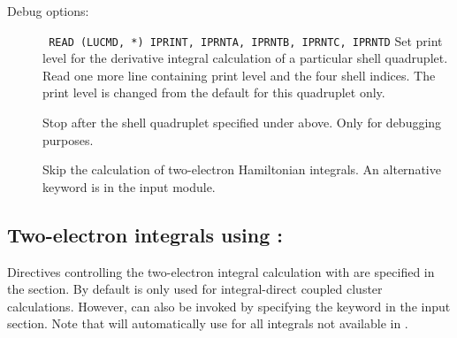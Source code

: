 Debug options:

\begin{description}

\item[]\verb| |\newline
\verb|READ (LUCMD, *) IPRINT, IPRNTA, IPRNTB, IPRNTC, IPRNTD|
Set print level for the derivative integral calculation of a particular shell
quadruplet.  Read one more line containing print level and the four
shell indices.  The print level is changed from the default
for this quadruplet only.

\item[] Stop after the shell quadruplet specified
under  above. Only for debugging purposes.

\item[] Skip the calculation of two-electron Hamiltonian
integrals. An alternative keyword is  in the 
input module.


\end{description}


\subsection{Two-electron integrals using {\eri}: }
\label{ch:eri}

Directives controlling the two-electron integral calculation with {\eri}
are specified in the  section.
By default {\eri} is only used for integral-direct coupled cluster
calculations. However, {\eri} can also be invoked by specifying the
 keyword in the  input section. Note that
{\dalton} will automatically use {\twoint} for all integrals not
available in {\eri}.

